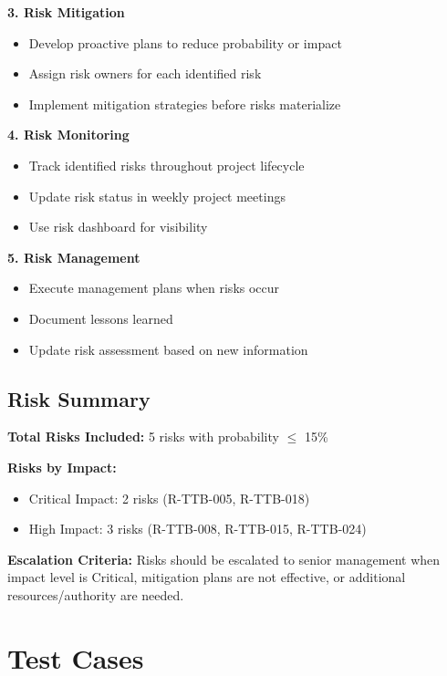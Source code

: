 \textbf{3. Risk Mitigation}
\begin{itemize}[leftmargin=*]
    \item Develop proactive plans to reduce probability or impact
    \item Assign risk owners for each identified risk
    \item Implement mitigation strategies before risks materialize
\end{itemize}

\textbf{4. Risk Monitoring}
\begin{itemize}[leftmargin=*]
    \item Track identified risks throughout project lifecycle
    \item Update risk status in weekly project meetings
    \item Use risk dashboard for visibility
\end{itemize}

\textbf{5. Risk Management}
\begin{itemize}[leftmargin=*]
    \item Execute management plans when risks occur
    \item Document lessons learned
    \item Update risk assessment based on new information
\end{itemize}

\subsection{Risk Summary}

\textbf{Total Risks Included:} 5 risks with probability $\leq$ 15\%

\textbf{Risks by Impact:}
\begin{itemize}[leftmargin=*]
    \item Critical Impact: 2 risks (R-TTB-005, R-TTB-018)
    \item High Impact: 3 risks (R-TTB-008, R-TTB-015, R-TTB-024)
\end{itemize}

\textbf{Escalation Criteria:} Risks should be escalated to senior management when impact level is Critical, mitigation plans are not effective, or additional resources/authority are needed.

\section{Test Cases}

